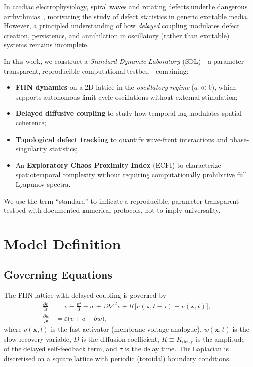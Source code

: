 \documentclass[11pt,a4paper]{article}
\begin{document}
In cardiac electrophysiology, spiral waves and rotating defects
underlie dangerous arrhythmias~\cite{Winfree1987,Karma1994},
motivating the study of defect statistics in generic excitable
media. However, a principled understanding of how \emph{delayed}
coupling modulates defect creation, persistence, and annihilation
in oscillatory (rather than excitable) systems remains
incomplete.

In this work, we construct a \textit{Standard Dynamic Laboratory}
(SDL)---a parameter-transparent, reproducible computational
testbed---combining:
\begin{itemize}
    \item \textbf{FHN dynamics} on a 2D lattice in the
          \textit{oscillatory regime} ($a \ll 0$), which supports
          autonomous limit-cycle oscillations without external
          stimulation;
    \item \textbf{Delayed diffusive coupling} to study how temporal
          lag modulates spatial coherence;
    \item \textbf{Topological defect tracking} to quantify
          wave-front interactions and phase-singularity statistics;
    \item An \textbf{Exploratory Chaos Proximity Index} (ECPI) to
          characterize spatiotemporal complexity without requiring
          computationally prohibitive full Lyapunov spectra.
\end{itemize}

We use the term ``standard'' to indicate a reproducible,
parameter-transparent testbed with documented numerical
protocols, not to imply universality.

\section{Model Definition}

\subsection{Governing Equations}

The FHN lattice with delayed coupling is governed by
\begin{align}
    \frac{\partial v}{\partial t} &= v - \frac{v^3}{3} - w
      + D\nabla^2 v
      + K\bigl[v(\mathbf{x},t-\tau) - v(\mathbf{x},t)\bigr],
      \label{eq:fv}\\
    \frac{\partial w}{\partial t} &= \varepsilon
      \bigl(v + a - bw\bigr),
      \label{eq:fw}
\end{align}
where $v(\mathbf{x},t)$ is the fast activator (membrane
voltage analogue), $w(\mathbf{x},t)$ is the slow recovery
variable, $D$ is the diffusion coefficient, $K \equiv
K_{\text{delay}}$ is the amplitude of the delayed self-feedback
term, and $\tau$ is the delay time. The Laplacian is discretised
on a square lattice with periodic (toroidal) boundary conditions.
\end{document}

